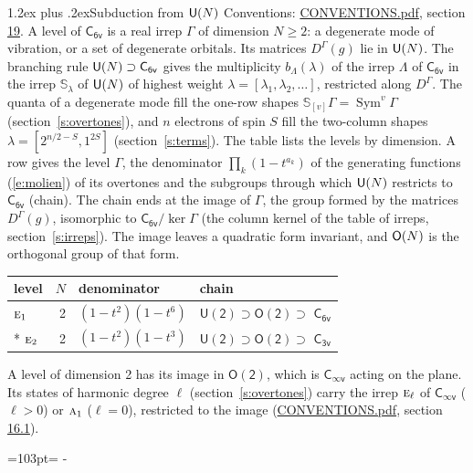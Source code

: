\documentclass[10pt,a4paper]{article}
\makeatletter
\renewcommand\section{\@startsection{section}{1}{\z@}{-3ex plus -1ex minus -.2ex}%
  {1.2ex plus .2ex}{\normalfont\large\sffamily\bfseries\color{parttitle}}}
\newcommand{\needspace}[1]{\par\penalty-100\begingroup\dimen0=#1\relax\dimen2=\pagegoal
  \advance\dimen2-\pagetotal\ifdim\dimen0>\dimen2\relax\ifdim\dimen2>0pt\vfil\break\fi\fi
  \endgroup}
\numberwithin{equation}{section}
\newcommand{\grp}[1]{\mathsf{#1}}
\newcommand{\irr}[1]{\text{\normalfont\scshape #1}}
\newcommand{\repD}[1]{D^{#1}}
\newcommand{\schur}[1]{\mathbb{S}_{#1}}
\newcommand{\shape}[1]{[#1]}
\makeatother
\begin{document}
\section{Subduction from \texorpdfstring{$\grp{U(\mathnormal{N})}$}{U(N)}}\label{s:unitary}
Conventions: \href{../../CONVENTIONS.pdf}{CONVENTIONS.pdf}, section \href{../../CONVENTIONS.pdf\#conv.19}{19}.
\leavevmode\label{n:local.level.dimension}A level of $\grp{C_{6v}}$ is a real irrep $\Gamma$ of dimension $N \ge 2$: a degenerate mode of vibration, or a set of degenerate orbitals. \label{n:group.unitary}Its matrices $\repD{\Gamma}(g)$ lie in $\grp{U(\mathnormal{N})}$. \label{n:irrep.schur}\label{n:shape.partition}\label{n:local.partition}\label{n:function.multiplicity.unitary}The branching rule $\grp{U(\mathnormal{N})} \supset \grp{C_{6v}}$ gives the multiplicity $b_\Lambda(\lambda)$ of the irrep $\Lambda$ of $\grp{C_{6v}}$ in the irrep $\schur{\lambda}$ of $\grp{U(\mathnormal{N})}$ of highest weight $\lambda = \shape{\lambda_1, \lambda_2, \dots}$, restricted along $\repD{\Gamma}$. \label{n:local.partition.power}\label{n:local.electrons}\label{n:local.spin}The quanta of a degenerate mode fill the one-row shapes $\schur{\shape{v}}\Gamma = \operatorname{Sym}^{v}\Gamma$ (section~\ref{s:overtones}), and $n$ electrons of spin $S$ fill the two-column shapes $\lambda = \shape{2^{n/2-S}, 1^{2S}}$ (section~\ref{s:terms}).
The table lists the levels by dimension. \label{n:head.level}\label{n:head.denominator}\label{n:index.overtone.denominator}\label{n:head.chain}A row gives the level $\Gamma$, the denominator $\prod_k (1 - t^{a_k})$ of the generating functions (\ref{e:molien}) of its overtones and the subgroups through which $\grp{U(\mathnormal{N})}$ restricts to $\grp{C_{6v}}$ (chain). The chain ends at the image of $\Gamma$, the group formed by the matrices $\repD{\Gamma}(g)$, isomorphic to $\grp{C_{6v}}/\ker\Gamma$ (the column kernel of the table of irreps, section~\ref{s:irreps}). The image leaves a quadratic form invariant, and $\grp{O(\mathnormal{N})}$ is the orthogonal group of that form.
{\small\begin{longtable}{@{}lrll@{}}\toprule
level & $N$ & denominator & chain\\\midrule\endhead
\bottomrule\endfoot\endlastfoot
$\irr{e}_{1}$ & 2 & $(1-t^{2})(1-t^{6})$ & $\grp{U(2)} \supset \grp{O(2)} \supset$ \href{C6v.pdf}{$\grp{C_{6v}}$}\\*
$\irr{e}_{2}$ & 2 & $(1-t^{2})(1-t^{3})$ & $\grp{U(2)} \supset \grp{O(2)} \supset$ \href{C3v.pdf}{$\grp{C_{3v}}$}\\
\bottomrule\end{longtable}}
A level of dimension 2 has its image in $\grp{O(2)}$, which is \href{Cinfv.pdf}{$\grp{C_{\infty v}}$} acting on the plane. \label{n:index.harmonic.degree}Its states of harmonic degree $\ell$ (section~\ref{s:overtones}) carry the irrep $\irr{e}_{\ell}$ of \href{Cinfv.pdf}{$\grp{C_{\infty v}}$} ($\ell > 0$) or $\irr{a}_{1}$ ($\ell = 0$), restricted to the image (\href{../../CONVENTIONS.pdf}{CONVENTIONS.pdf}, section \href{../../CONVENTIONS.pdf\#conv.16.1}{16.1}).
\needspace{103pt}
\end{document}
